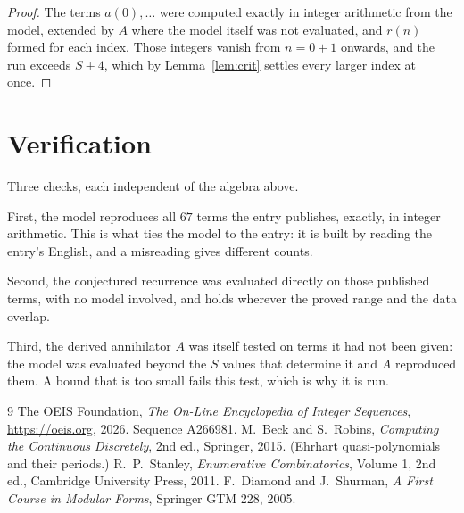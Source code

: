 \documentclass[11pt,a4paper]{article}
\theoremstyle{plain}
\theoremstyle{definition}
\begin{document}
\begin{proof}
The terms $a(0),\dots$ were computed exactly in integer arithmetic from the model, extended by
$A$ where the model itself was not evaluated, and $r(n)$ formed for each index. Those integers
vanish from $n=0+1$ onwards, and the run exceeds $S+4$, which by
Lemma~\ref{lem:crit} settles every larger index at once.
\end{proof}

\section{Verification}

Three checks, each independent of the algebra above.

First, the model reproduces all $67$ terms the entry publishes, exactly, in integer
arithmetic. This is what ties the model to the entry: it is built by reading the entry's
English, and a misreading gives different counts.

Second, the conjectured recurrence was evaluated directly on those published terms, with no
model involved, and holds wherever the proved range and the data overlap.

Third, the derived annihilator $A$ was itself tested on terms it had not been given: the model
was evaluated beyond the $S$ values that determine it and $A$ reproduced them. A bound that is
too small fails this test, which is why it is run.

\begin{thebibliography}{9}
 The OEIS Foundation, \emph{The On-Line Encyclopedia of Integer
Sequences}, \url{https://oeis.org}, 2026. Sequence A266981.
 M.~Beck and S.~Robins, \emph{Computing the Continuous Discretely},
2nd ed., Springer, 2015. (Ehrhart quasi-polynomials and their periods.)
 R.~P.~Stanley, \emph{Enumerative Combinatorics}, Volume 1, 2nd ed.,
Cambridge University Press, 2011.
 F.~Diamond and J.~Shurman, \emph{A First Course in Modular Forms},
Springer GTM 228, 2005.
\end{thebibliography}
\end{document}
